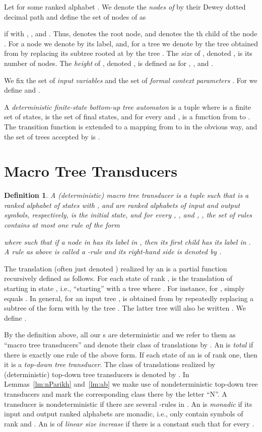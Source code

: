 \documentclass[copyright,creativecommons]{eptcs}
\newtheorem{definition}{Definition}
\begin{document}
Let  for some ranked alphabet .
We denote the \emph{nodes of } by their Dewey dotted decimal path and
define the set  of nodes of  as

if  with , , and
. Thus,  denotes the root node,
and  denotes the th child of the node .
For a node  we denote by  its label, and,
for a tree  we denote by  
the tree obtained from  by replacing its subtree rooted at 
by the tree .
The \emph{size} of , denoted , is its number  of nodes.
The \emph{height} of , denoted , is defined as
 for
, 
, 
and .

We fix the set of \emph{input variables}  and the set
of \emph{formal context parameters} . 
For  we define  and .

A \emph{deterministic finite-state bottom-up tree automaton} is a tuple
 where  is a finite set of states, 
 is the set of final states, and for every 
and ,  is a function from  to .
The transition function  is extended to a mapping from  to  in 
the obvious way, and the set of trees accepted by  is
.

\section{Macro Tree Transducers}

\begin{definition}\rm
A \emph{(deterministic) macro tree transducer}  is a tuple 
such that  is a ranked alphabet of states with , 
 and  are ranked alphabets of input and output
symbols, respectively,  is the initial state, and
for every , , and , , 
the set of rules  contains at most one rule of the form

where  such that
if a node in  has its label in , then its first child has 
its label in . A rule as above is called a -rule and 
its right-hand side is denoted by .
\end{definition}

The translation  (often just denoted )
realized by an   is a partial function recursively defined as follows.
For each state  of rank , 
is the translation of  starting in state , i.e.,
``starting'' with a tree  where .
For instance, for ,  simply
equals .
In general, for an input tree ,
 is obtained from  by repeatedly replacing
a subtree of the form  
with 
by
the tree .
The latter tree will also be written 
.
We define .

By the definition above, all our s are deterministic 
and we refer to them as ``macro tree transducers'' and
denote their class of translations by .
An  is \emph{total} if there is exactly one rule of the above form. 
If each state of an  is of rank one, 
then it is a \emph{top-down tree transducer}.
The class of translations realized by (deterministic) 
top-down tree transducers is denoted by .
In Lemmas~\ref{lm:nParikh} and~\ref{lm:ab} we 
make use of nondeterministic top-down tree transducers
and mark the corresponding class there by the letter ``N''.
A transducer is nondeterministic if there are several 
-rules in . An  is \emph{monadic} if its
input and output ranked alphabets are monadic, i.e., only contain
symbols of rank  and .
An   is of \emph{linear size increase} if there is a constant  
such that  for every . 
\end{document}
